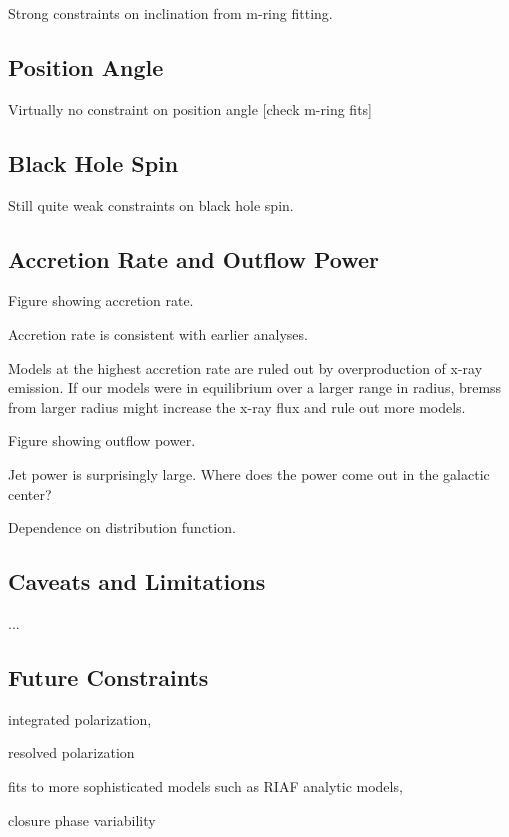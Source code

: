 
Strong constraints on inclination from m-ring fitting.

\subsection{Position Angle}

Virtually no constraint on position angle [check m-ring fits]

\subsection{Black Hole Spin}

Still quite weak constraints on black hole spin.

\subsection{Accretion Rate and Outflow Power}


Figure showing accretion rate.

Accretion rate is consistent with earlier analyses.

Models at the highest accretion rate are ruled out by overproduction of x-ray emission.  If our models were in equilibrium over a larger range in radius, bremss from larger radius might increase the x-ray flux and rule out more models.

Figure showing outflow power.

Jet power is surprisingly large.  Where does the power come out in the galactic center?

Dependence on distribution function.


\subsection{Caveats and Limitations}

...

\subsection{Future Constraints}


integrated polarization,

resolved polarization

fits to more sophisticated models such as RIAF analytic models,

closure phase variability
